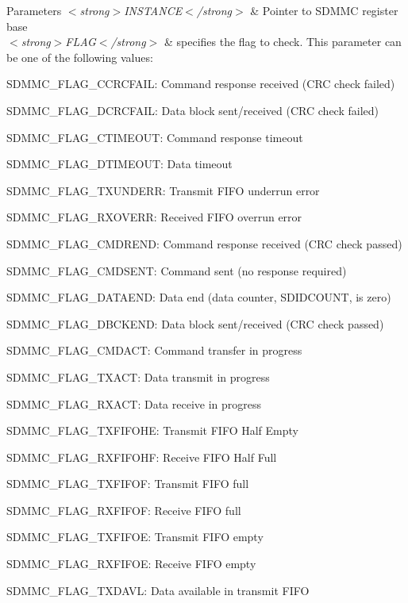 \begin{DoxyParams}{Parameters}
{\em $<$strong$>$\+I\+N\+S\+T\+A\+N\+C\+E$<$/strong$>$} & Pointer to S\+D\+M\+MC register base\\
\hline
{\em $<$strong$>$\+F\+L\+A\+G$<$/strong$>$} & specifies the flag to check. This parameter can be one of the following values\+: \begin{DoxyItemize}
\item S\+D\+M\+M\+C\+\_\+\+F\+L\+A\+G\+\_\+\+C\+C\+R\+C\+F\+A\+IL\+: Command response received (C\+RC check failed) \item S\+D\+M\+M\+C\+\_\+\+F\+L\+A\+G\+\_\+\+D\+C\+R\+C\+F\+A\+IL\+: Data block sent/received (C\+RC check failed) \item S\+D\+M\+M\+C\+\_\+\+F\+L\+A\+G\+\_\+\+C\+T\+I\+M\+E\+O\+UT\+: Command response timeout \item S\+D\+M\+M\+C\+\_\+\+F\+L\+A\+G\+\_\+\+D\+T\+I\+M\+E\+O\+UT\+: Data timeout \item S\+D\+M\+M\+C\+\_\+\+F\+L\+A\+G\+\_\+\+T\+X\+U\+N\+D\+E\+RR\+: Transmit F\+I\+FO underrun error \item S\+D\+M\+M\+C\+\_\+\+F\+L\+A\+G\+\_\+\+R\+X\+O\+V\+E\+RR\+: Received F\+I\+FO overrun error \item S\+D\+M\+M\+C\+\_\+\+F\+L\+A\+G\+\_\+\+C\+M\+D\+R\+E\+ND\+: Command response received (C\+RC check passed) \item S\+D\+M\+M\+C\+\_\+\+F\+L\+A\+G\+\_\+\+C\+M\+D\+S\+E\+NT\+: Command sent (no response required) \item S\+D\+M\+M\+C\+\_\+\+F\+L\+A\+G\+\_\+\+D\+A\+T\+A\+E\+ND\+: Data end (data counter, S\+D\+I\+D\+C\+O\+U\+NT, is zero) \item S\+D\+M\+M\+C\+\_\+\+F\+L\+A\+G\+\_\+\+D\+B\+C\+K\+E\+ND\+: Data block sent/received (C\+RC check passed) \item S\+D\+M\+M\+C\+\_\+\+F\+L\+A\+G\+\_\+\+C\+M\+D\+A\+CT\+: Command transfer in progress \item S\+D\+M\+M\+C\+\_\+\+F\+L\+A\+G\+\_\+\+T\+X\+A\+CT\+: Data transmit in progress \item S\+D\+M\+M\+C\+\_\+\+F\+L\+A\+G\+\_\+\+R\+X\+A\+CT\+: Data receive in progress \item S\+D\+M\+M\+C\+\_\+\+F\+L\+A\+G\+\_\+\+T\+X\+F\+I\+F\+O\+HE\+: Transmit F\+I\+FO Half Empty \item S\+D\+M\+M\+C\+\_\+\+F\+L\+A\+G\+\_\+\+R\+X\+F\+I\+F\+O\+HF\+: Receive F\+I\+FO Half Full \item S\+D\+M\+M\+C\+\_\+\+F\+L\+A\+G\+\_\+\+T\+X\+F\+I\+F\+OF\+: Transmit F\+I\+FO full \item S\+D\+M\+M\+C\+\_\+\+F\+L\+A\+G\+\_\+\+R\+X\+F\+I\+F\+OF\+: Receive F\+I\+FO full \item S\+D\+M\+M\+C\+\_\+\+F\+L\+A\+G\+\_\+\+T\+X\+F\+I\+F\+OE\+: Transmit F\+I\+FO empty \item S\+D\+M\+M\+C\+\_\+\+F\+L\+A\+G\+\_\+\+R\+X\+F\+I\+F\+OE\+: Receive F\+I\+FO empty \item S\+D\+M\+M\+C\+\_\+\+F\+L\+A\+G\+\_\+\+T\+X\+D\+A\+VL\+: Data available in transmit F\+I\+FO \item 
\end{DoxyItemize}
\end{DoxyParams}
